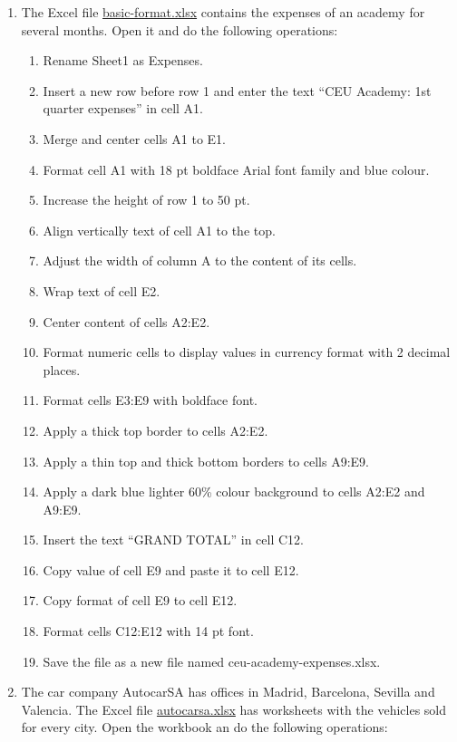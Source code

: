 \begin{enumerate}[leftmargin=*]
\item The Excel file
\href{http://aprendeconalf.es/office/excel/exercises/introduction/basic-format.xlsx}{\textsf{basic-format.xlsx}}
contains the expenses of an academy for several months.
Open it and do the following operations:
\begin{enumerate}
\item Rename \textsf{Sheet1} as \textsf{Expenses}.
\item Insert a new row before row 1 and enter the text ``CEU Academy: 1st quarter expenses'' in cell A1.
\item Merge and center cells A1 to E1.
\item Format cell A1 with 18 pt boldface Arial font family and blue colour.
\item Increase the height of row 1 to 50 pt.
\item Align vertically text of cell A1 to the top.
\item Adjust the width of column A to the content of its cells.
\item Wrap text of cell E2.
\item Center content of cells A2:E2.
\item Format numeric cells to display values in currency format with 2 decimal places.
\item Format cells E3:E9 with boldface font.
\item Apply a thick top border to cells A2:E2.
\item Apply a thin top and thick bottom borders to cells A9:E9.
\item Apply a dark blue lighter 60\% colour background to cells A2:E2 and A9:E9.
\item Insert the text ``GRAND TOTAL'' in cell C12.
\item Copy value of cell E9 and paste it to cell E12.
\item Copy format of cell E9 to cell E12. 
\item Format cells C12:E12 with 14 pt font.
\item Save the file as a new file named \textsf{ceu-academy-expenses.xlsx}.
\end{enumerate}

\item The car company AutocarSA has offices in Madrid, Barcelona, Sevilla and Valencia. 
The Excel file
\href{http://aprendeconalf.es/office/excel/exercises/introduction/autocarsa.xlsx}{\textsf{autocarsa.xlsx}} has
worksheets with the vehicles sold for every city.
Open the workbook an do the following operations:




\end{enumerate}